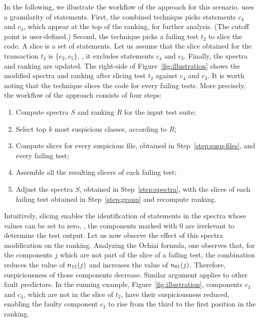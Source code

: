 \documentclass{article}
\begin{document}
In the following, we illustrate the workflow of the \comb{}
approach for this scenario. \comb{} uses a granularity of statements.
First, the combined technique picks statements $c_4$ and $c_3$, which
appear at the top of the ranking, for further analysis.
(The cutoff point is user-defined.) Second, the
technique picks a failing test $t_2$ to slice the code. A slice is a
set of statements. Let us assume
that the slice obtained for the transaction $t_2$ is $\{c_2, c_5\}$,
\ie, it excludes statements $c_4$ and $c_3$. Finally, the spectra and
ranking are updated. The right-side of Figure~\ref{fig:illustration}
shows the modified spectra and ranking after slicing test $t_2$
against $c_4$ and $c_3$. It is worth noting that the technique slices
the code for every failing tests. More precisely, the workflow of the
\comb{} approach consists of four steps:
\begin{enumerate}
  \itemsep0em
  \item\label{step:spectra} Compute spectra $S$ and ranking $R$ for
  the input test suite;
  \item\label{step:susp-files} Select top $k$ most suspicious classes, according to $R$;
  \item\label{step:compute-slice} Compute slicer for every suspicious
    file, obtained in Step~\ref{step:susp-files}, and every failing test;
  \item\label{step:group} Assemble all the resulting slicers of each failing test;
  \item Adjust the spectra $S$, obtained in Step~\ref{step:spectra}, with
    the slices of each failing test obtained in Step~\ref{step:group} and recompute ranking.
\end{enumerate}

Intuitively, slicing enables the identification of statements in the spectra
whose values can be set to zero, \ie{}, the components marked with $0$
are irrelevant to determine the test output. Let us now observe the
effect of this spectra modification on the ranking. Analyzing the
Ochiai formula, one observes that, for the components $j$ which are
not part of the slice of a failing test, the combination reduces the
value of $n_{11}(j)$ and increases the value of $n_{01}(j)$. Therefore,
suspiciousness of those components decrease. Similar argument applies
to other fault predictors. In the running example,
Figure~\ref{fig:illustration}, components $c_3$ and $c_4$, which are
not in the slice of $t_2$, have their suspiciousness reduced, enabling
the faulty component $c_2$ to rise from the third to the first
position in the ranking.
\end{document}
